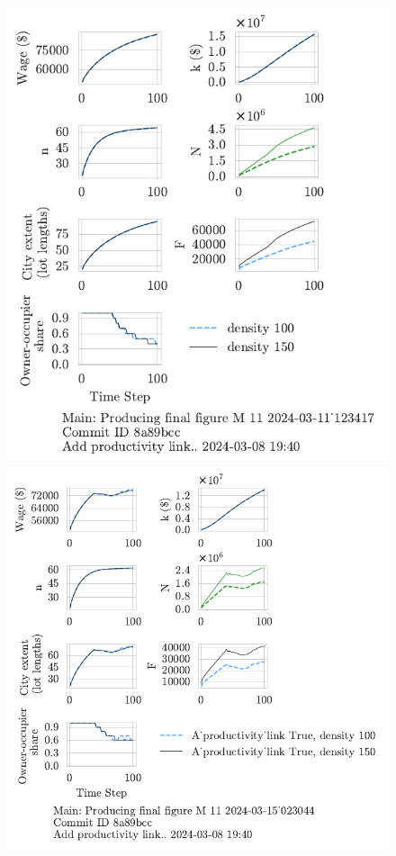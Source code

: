 \begin{figure}[h!tb] 
    \centering
    \includegraphics[scale=.75, trim={0 1.4cm 1.5cm 0},clip]{fig/density-Main-123417.pdf} 
    \includegraphics[scale=.75, trim={0 1.4cm 3.2cm 0},clip]{fig/With-productivity_link-density-023044.pdf} 

\end{figure}
